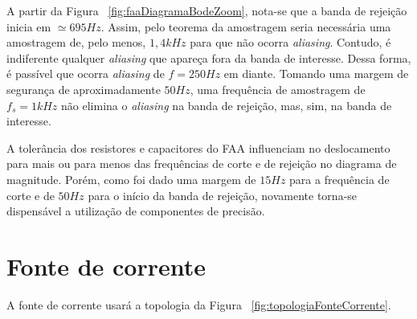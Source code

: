 \documentclass[
	12pt,				%
	openright,			%
	twoside,			%
	a4paper,			%
	english,			%
	french,				%
	spanish,			%
	brazil,				%
	]{abntex2}
\begin{document}
		A partir da Figura ~\ref{fig:faaDiagramaBodeZoom}, nota-se que a banda de rejeição inicia em
		$\simeq 695Hz$. Assim, pelo teorema da amostragem seria necessária uma amostragem
		de, pelo menos, $1,4kHz$ para que não ocorra \textit{aliasing}. Contudo,
		é indiferente qualquer \textit{aliasing} que apareça fora da banda de interesse.
		Dessa forma, é passível que ocorra \textit{aliasing} de $f=250Hz$ em diante. Tomando
		uma margem de segurança de aproximadamente $50Hz$, uma frequência de amostragem
		de $f_s=1kHz$ não elimina o \textit{aliasing} na banda de rejeição, mas, sim, na banda
		de interesse.

		A tolerância dos resistores e capacitores do FAA influenciam no
		deslocamento para mais ou para menos das frequências de corte e
		de rejeição no diagrama de magnitude. Porém, como foi dado uma
		margem de $15Hz$ para a frequência de corte e de $50Hz$ para o
		início da banda de rejeição, novamente torna-se dispensável a
		utilização de componentes de precisão.
		\newpage

	\section{Fonte de corrente}

		A fonte de corrente usará a topologia da Figura ~\ref{fig:topologiaFonteCorrente}.
\end{document}

